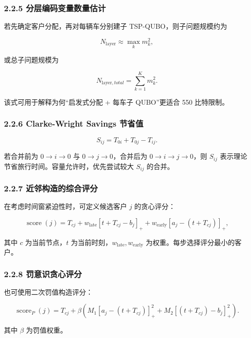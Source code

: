 \documentclass[
  a4paper,
]{ctexart}
\begin{document}
\subsubsection{2.2.5
分层编码变量数量估计}\label{ux5206ux5c42ux7f16ux7801ux53d8ux91cfux6570ux91cfux4f30ux8ba1}

若先确定客户分配，再对每辆车分别建子 TSP-QUBO，则子问题规模约为

\[
N_{\mathrm{layer}}\approx \max_k m_k^2,
\]

或总子问题规模为

\[
N_{\mathrm{layer},total}=\sum_{k=1}^{K}m_k^2.
\]

该式可用于解释为何``启发式分配 + 每车子 QUBO''更适合 550 比特限制。

\subsubsection{2.2.6 Clarke-Wright Savings
节省值}\label{clarke-wright-savings-ux8282ux7701ux503c}

\[
S_{ij}=T_{0i}+T_{0j}-T_{ij}.
\]

若合并前为 \(0\to i\to 0\) 与 \(0\to j\to 0\)，合并后为
\(0\to i\to j\to 0\)，则 \(S_{ij}\)
表示理论节省旅行时间。容量允许时，优先尝试较大 \(S_{ij}\) 的合并。

\subsubsection{2.2.7
近邻构造的综合评分}\label{ux8fd1ux90bbux6784ux9020ux7684ux7efcux5408ux8bc4ux5206}

在考虑时间窗紧迫性时，可定义候选客户 \(j\) 的贪心评分：

\[
\operatorname{score}(j)=T_{cj}+w_{\mathrm{late}}[t+T_{cj}-b_j]_+ + w_{\mathrm{early}}[a_j-(t+T_{cj})]_+,
\]

其中 \(c\) 为当前节点，\(t\)
为当前时刻，\(w_{\mathrm{late}},w_{\mathrm{early}}\)
为权重。每步选择评分最小的客户。

\subsubsection{2.2.8
罚意识贪心评分}\label{ux7f5aux610fux8bc6ux8d2aux5fc3ux8bc4ux5206}

也可使用二次罚值构造评分：

\[
\operatorname{score}_{P}(j)=T_{cj}+\beta\left(M_1[a_j-(t+T_{cj})]_+^2+M_2[(t+T_{cj})-b_j]_+^2\right).
\]

其中 \(\beta\) 为罚值权重。
\end{document}
